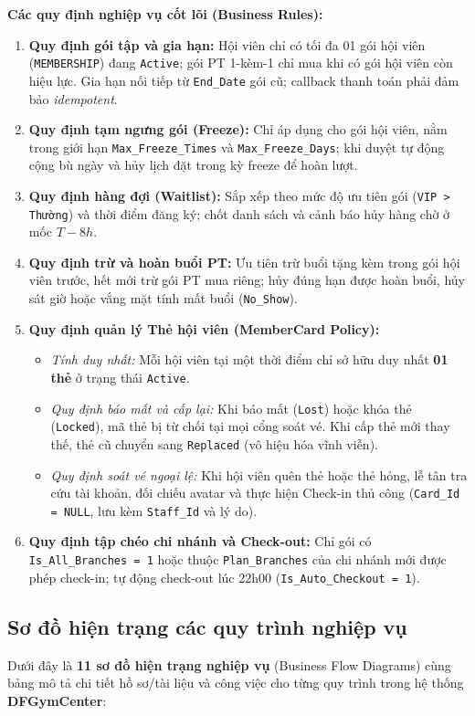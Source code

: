 \documentclass[a4paper,12pt]{article}
\begin{document}
\newpage
\textbf{Các quy định nghiệp vụ cốt lõi (Business Rules):}
\begin{enumerate}
    \item \textbf{Quy định gói tập và gia hạn:} Hội viên chỉ có tối đa 01 gói hội viên (\texttt{MEMBERSHIP}) đang \texttt{Active}; gói PT 1-kèm-1 chỉ mua khi có gói hội viên còn hiệu lực. Gia hạn nối tiếp từ \texttt{End\_Date} gói cũ; callback thanh toán phải đảm bảo \textit{idempotent}.
    \item \textbf{Quy định tạm ngưng gói (Freeze):} Chỉ áp dụng cho gói hội viên, nằm trong giới hạn \texttt{Max\_Freeze\_Times} và \texttt{Max\_Freeze\_Days}; khi duyệt tự động cộng bù ngày và hủy lịch đặt trong kỳ freeze để hoàn lượt.
    \item \textbf{Quy định hàng đợi (Waitlist):} Sắp xếp theo mức độ ưu tiên gói (\texttt{VIP > Thường}) và thời điểm đăng ký; chốt danh sách và cảnh báo hủy hàng chờ ở mốc $T-8h$.
    \item \textbf{Quy định trừ và hoàn buổi PT:} Ưu tiên trừ buổi tặng kèm trong gói hội viên trước, hết mới trừ gói PT mua riêng; hủy đúng hạn được hoàn buổi, hủy sát giờ hoặc vắng mặt tính mất buổi (\texttt{No\_Show}).
    \item \textbf{Quy định quản lý Thẻ hội viên (MemberCard Policy):}
    \begin{itemize}
        \item \textit{Tính duy nhất:} Mỗi hội viên tại một thời điểm chỉ sở hữu duy nhất \textbf{01 thẻ} ở trạng thái \texttt{Active}.
        \item \textit{Quy định báo mất và cấp lại:} Khi báo mất (\texttt{Lost}) hoặc khóa thẻ (\texttt{Locked}), mã thẻ bị từ chối tại mọi cổng soát vé. Khi cấp thẻ mới thay thế, thẻ cũ chuyển sang \texttt{Replaced} (vô hiệu hóa vĩnh viễn).
        \item \textit{Quy định soát vé ngoại lệ:} Khi hội viên quên thẻ hoặc thẻ hỏng, lễ tân tra cứu tài khoản, đối chiếu avatar và thực hiện Check-in thủ công (\texttt{Card\_Id = NULL}, lưu kèm \texttt{Staff\_Id} và lý do).
    \end{itemize}
    \item \textbf{Quy định tập chéo chi nhánh và Check-out:} Chỉ gói có \texttt{Is\_All\_Branches = 1} hoặc thuộc \texttt{Plan\_Branches} của chi nhánh mới được phép check-in; tự động check-out lúc 22h00 (\texttt{Is\_Auto\_Checkout = 1}).
\end{enumerate}

\subsection{Sơ đồ hiện trạng các quy trình nghiệp vụ}
Dưới đây là \textbf{11 sơ đồ hiện trạng nghiệp vụ} (Business Flow Diagrams) cùng bảng mô tả chi tiết hồ sơ/tài liệu và công việc cho từng quy trình trong hệ thống \textbf{DFGymCenter}:
\end{document}
